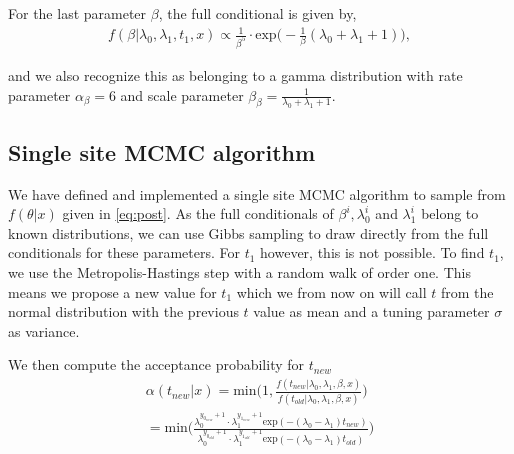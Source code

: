 For the last parameter $\beta$, the full conditional is given by,
\begin{align}
    f(\beta | \lambda_0, \lambda_1, t_1, x) \propto 
    \frac{1}{\beta^5} \cdot \text{exp} \Big( -\frac{1}{\beta}(\lambda_0 + \lambda_1 + 1) \Big),
\end{align}

and we also recognize this as belonging to a gamma distribution with rate parameter $\alpha_{\beta} = 6$ and scale parameter $\beta_{\beta} = \frac{1}{\lambda_0 + \lambda_1 + 1} $. 




\subsection{Single site MCMC algorithm}

We have defined and implemented a single site MCMC algorithm to sample from $f(\theta |x)$ given in \ref{eq:post}. As the full conditionals of $\beta^i, \lambda_0^i$ and $\lambda_1^i$ belong to known distributions, we can use Gibbs sampling to draw directly from the full conditionals for these parameters. For $t_1$ however, this is not possible.
To find $t_1$, we use the Metropolis-Hastings step with a random walk of order one. This means we propose a new value for $t_1$ which we from now on will call $t$ from the normal distribution with the previous $t$ value as mean and a tuning parameter $\sigma$ as variance. 


We then compute the acceptance probability for $t_{new}$
\begin{align}
    \alpha(t_{new}|x) = \text{min} \Big( 1, \frac{f(t_{new}| \lambda_0, \lambda_1, \beta, x)}{f(t_{old}| \lambda_0, \lambda_1, \beta, x)} \Big) \nonumber \\ 
    = \text{min} \Big( \frac{\lambda_0^{y_{0_{new}} + 1} \cdot \lambda_1^{y_{1_{new}} + 1} \text{exp}(-(\lambda_0 - \lambda_1)t_{new})}{\lambda_0^{y_{0_{old}} + 1} \cdot \lambda_1^{y_{1_{old}} + 1} \text{exp}(-(\lambda_0 - \lambda_1)t_{old})} \Big) \nonumber 
\end{align}

